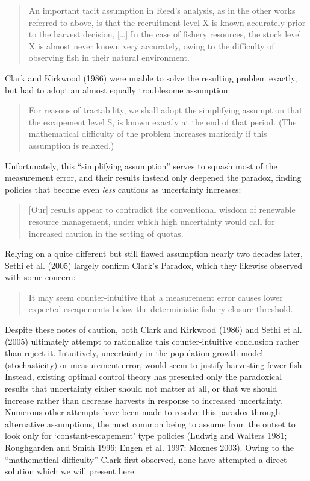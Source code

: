\documentclass[3p]{elsarticle} %
\begin{document}
\begin{quote}
An important tacit assumption in Reed's analysis, as in the other works
referred to above, is that the recruitment level X is known accurately
prior to the harvest decision, {[}\ldots{}{]} In the case of fishery
resources, the stock level X is almost never known very accurately,
owing to the difficulty of observing fish in their natural environment.
\end{quote}

Clark and Kirkwood (1986) were unable to solve the resulting problem
exactly, but had to adopt an almost equally troublesome assumption:

\begin{quote}
For reasons of tractability, we shall adopt the simplifying assumption
that the escapement level S, is known exactly at the end of that period.
(The mathematical difficulty of the problem increases markedly if this
assumption is relaxed.)
\end{quote}

Unfortunately, this ``simplifying assumption'' serves to squash most of
the measurement error, and their results instead only deepened the
paradox, finding policies that become even \emph{less} cautious as
uncertainty increases:

\begin{quote}
{[}Our{]} results appear to contradict the conventional wisdom of
renewable resource management, under which high uncertainty would call
for increased caution in the setting of quotas.
\end{quote}

Relying on a quite different but still flawed assumption nearly two
decades later, Sethi et al. (2005) largely confirm Clark's Paradox,
which they likewise observed with some concern:

\begin{quote}
It may seem counter-intuitive that a measurement error causes lower
expected escapements below the deterministic fishery closure threshold.
\end{quote}

Despite these notes of caution, both Clark and Kirkwood (1986) and Sethi
et al. (2005) ultimately attempt to rationalize this counter-intuitive
conclusion rather than reject it. Intuitively, uncertainty in the
population growth model (stochasticity) or measurement error, would seem
to justify harvesting fewer fish. Instead, existing optimal control
theory has presented only the paradoxical results that uncertainty
either should not matter at all, or that we should increase rather than
decrease harvests in response to increased uncertainty. Numerous other
attempts have been made to resolve this paradox through alternative
assumptions, the most common being to assume from the outset to look
only for `constant-escapement' type policies (Ludwig and Walters 1981;
Roughgarden and Smith 1996; Engen et al. 1997; Moxnes 2003). Owing to
the ``mathematical difficulty'' Clark first observed, none have
attempted a direct solution which we will present here.
\end{document}
